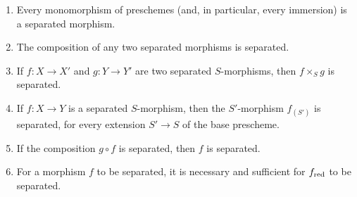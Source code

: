 \begin{prop}[5.5.1]
\label{1.5.5.1}
\medskip\noindent
\begin{enumerate}[label=\emph{(\roman*)}]
    \item Every monomorphism of preschemes (and, in particular, every immersion) is a separated morphism.
    \item The composition of any two separated morphisms is separated.
    \item If $f:X\to X'$ and $g:Y\to Y'$ are two separated $S$-morphisms, then $f\times_S g$ is separated.
    \item If $f:X\to Y$ is a separated $S$-morphism, then the $S'$-morphism $f_{(S')}$ is separated, for every extension $S'\to S$ of the base prescheme.
    \item If the composition $g\circ f$ is separated, then $f$ is separated.
    \item For a morphism $f$ to be separated, it is necessary and sufficient for $f_{\mathrm{red}}$  to be separated.
\end{enumerate}
\end{prop}

